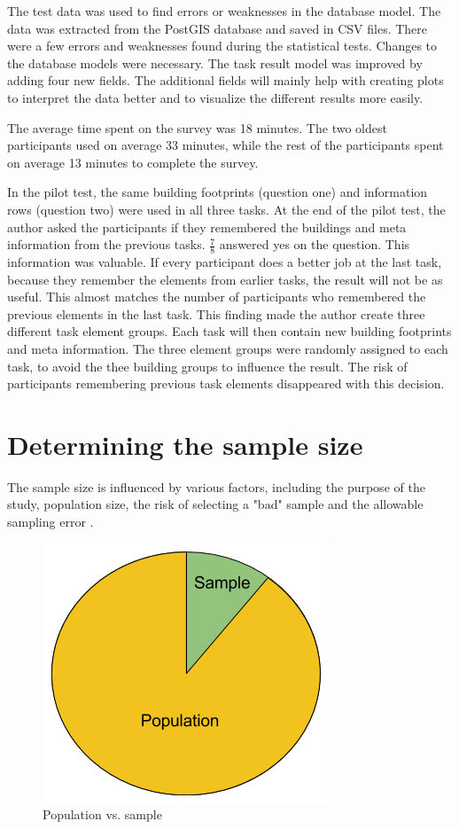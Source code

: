The test data was used to find errors or weaknesses in the database model. The data was extracted from the PostGIS database and saved in CSV files. There were a few errors and weaknesses found during the statistical tests. Changes to the database models were necessary. The task result model was improved by adding four new fields. The additional fields will mainly help with creating plots to interpret the data better and to visualize the different results more easily. 

The average time spent on the survey was 18 minutes. The two oldest participants used on average 33 minutes, while the rest of the participants spent on average 13 minutes to complete the survey. 

In the pilot test, the same building footprints (question one) and information rows (question two) were used in all three tasks. At the end of the pilot test, the author asked the participants if they remembered the buildings and meta information from the previous tasks. $\frac{7}{8}$ answered yes on the question. This information was valuable. If every participant does a better job at the last task, because they remember the elements from earlier tasks, the result will not be as useful. This almost matches the number of participants who remembered the previous elements in the last task. This finding made the author create three different task element groups. Each task will then contain new building footprints and meta information. The three element groups were randomly assigned to each task, to avoid the thee building groups to influence the result. The risk of participants remembering previous task elements disappeared with this decision. 

\section[Sample Size]{Determining the sample size}\label{sec:samplesize}
The sample size is influenced by various factors, including the purpose of the study, population size, the risk of selecting a "bad" sample and the allowable sampling error \citep{Israel1992}. 

\begin{figure}[h]
	\centering
	\includegraphics[width=0.35\linewidth]{fig/popsample}
	\caption{Population vs. sample}
	\label{fig:popsample}
\end{figure}

